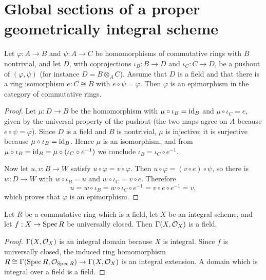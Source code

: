 \section{Global sections of a proper geometrically integral scheme}

\begin{lemma}
  \label{pa-lem:pushout_field_epi}
  \leanok

  Let \(\varphi : A \to B\) and \(\psi : A \to C\) be homomorphisms of commutative rings with
  \(B\) nontrivial, and let \(D\), with coprojections \(\iota_B : B \to D\) and
  \(\iota_C : C \to D\), be a pushout of \((\varphi, \psi)\) (for instance
  \(D = B \otimes_A C\)). Assume that \(D\) is a field and that there is a ring isomorphism
  \(e : C \cong B\) with \(e \circ \psi = \varphi\). Then \(\varphi\) is an epimorphism in the
  category of commutative rings.
\end{lemma}
\begin{proof}
  \leanok
  Let \(\mu : D \to B\) be the homomorphism with \(\mu \circ \iota_B = \operatorname{id}_B\) and
  \(\mu \circ \iota_C = e\), given by the universal property of the pushout (the two maps
  agree on \(A\) because \(e \circ \psi = \varphi\)). Since \(D\) is a field and \(B\) is
  nontrivial, \(\mu\) is injective; it is surjective because \(\mu \circ \iota_B = \operatorname{id}_B\).
  Hence \(\mu\) is an isomorphism, and from
  \(\mu \circ \iota_B = \operatorname{id}_B = \mu \circ (\iota_C \circ e^{-1})\) we conclude
  \(\iota_B = \iota_C \circ e^{-1}\).

  Now let \(u, v : B \to W\) satisfy \(u \circ \varphi = v \circ \varphi\). Then
  \(u \circ \varphi = (v \circ e) \circ \psi\), so there is
  \(w : D \to W\) with \(w \circ \iota_B = u\) and \(w \circ \iota_C = v \circ e\). Therefore
  \[
    u = w \circ \iota_B = w \circ \iota_C \circ e^{-1} = v \circ e \circ e^{-1} = v,
  \]
  which proves that \(\varphi\) is an epimorphism.
\end{proof}

\begin{lemma}
  \label{pa-lem:sections_field}
  \leanok

  Let \(R\) be a commutative ring which is a field, let \(X\) be an integral scheme, and let
  \(f : X \to \operatorname{Spec} R\) be universally closed. Then \(\Gamma(X, \mathcal{O}_{X})\) is a field.
\end{lemma}
\begin{proof}
  \leanok
  \(\Gamma(X, \mathcal{O}_{X})\) is an integral domain because \(X\) is integral. Since \(f\) is
  universally closed, the induced ring homomorphism
  \(R \cong \Gamma(\operatorname{Spec} R, \mathcal{O}_{\operatorname{Spec} R}) \to \Gamma(X, \mathcal{O}_{X})\) is an integral
  extension. A domain which is integral over a field is a field.
\end{proof}

